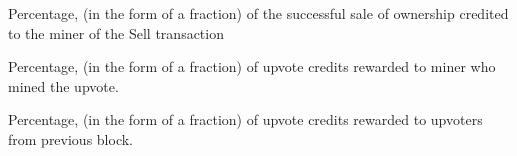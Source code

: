 \documentclass[letterpaper,10pt,english]{sphinxmanual}
\begin{document}

\begin{fulllineitems}
\label{\detokenize{index:node_state.SELL_TRANSACTION_MINER_REWARD}}
Percentage, (in the form of a fraction) of the successful sale of
ownership credited to the miner of the Sell transaction

\end{fulllineitems}


\begin{fulllineitems}
\label{\detokenize{index:node_state.UPVOTE_MINER_REWARD}}
Percentage, (in the form of a fraction) of upvote credits rewarded
to miner who mined the upvote.

\end{fulllineitems}


\begin{fulllineitems}
\label{\detokenize{index:node_state.UPVOTE_REWARD}}
Percentage, (in the form of a fraction) of upvote credits rewarded
to upvoters from previous block.

\end{fulllineitems}

\end{document}
